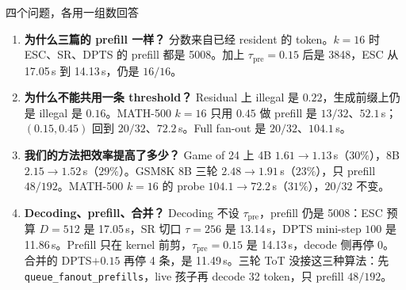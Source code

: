 \documentclass[aspectratio=169,10pt]{ctexbeamer}
\begin{document}
\begin{frame}{四个问题，各用一组数回答}
  \begin{enumerate}
    \item \textbf{为什么三篇的 prefill 一样？} 分数来自已经 resident 的 token。$k{=}16$ 时 ESC、SR、DPTS 的 prefill 都是 5008。加上 $\tau_{\mathrm{pre}}{=}0.15$ 后是 3848，ESC 从 17.05\,s 到 14.13\,s，仍是 $16/16$。
    \vspace{0.18em}
    \item \textbf{为什么不能共用一条 threshold？} Residual 上 illegal 是 $0.22$，生成前缀上仍是 illegal 是 $0.16$。MATH-500 $k{=}16$ 只用 $0.45$ 做 prefill 是 $13/32$、$52.1$\,s；$(0.15,0.45)$ 回到 $20/32$、$72.2$\,s。Full fan-out 是 $20/32$、$104.1$\,s。
    \vspace{0.18em}
    \item \textbf{我们的方法把效率提高了多少？} Game of 24 上 4B $1.61\to 1.13$\,s（$30\%$），8B $2.15\to 1.52$\,s（$29\%$）。GSM8K 8B 三轮 $2.48\to 1.91$\,s（$23\%$），只 prefill $48/192$。MATH-500 $k{=}16$ 的 probe $104.1\to 72.2$\,s（$31\%$），$20/32$ 不变。
    \vspace{0.18em}
    \item \textbf{Decoding、prefill、合并？} Decoding 不设 $\tau_{\mathrm{pre}}$，prefill 仍是 5008：ESC 预算 $D{=}512$ 是 17.05\,s，SR 切口 $\tau{=}256$ 是 13.14\,s，DPTS mini-step $100$ 是 11.86\,s。Prefill 只在 kernel 前剪，$\tau_{\mathrm{pre}}{=}0.15$ 是 14.13\,s，decode 侧再停 0。合并的 DPTS$+0.15$ 再停 4 条，是 11.49\,s。三轮 ToT 没接这三种算法：先 \texttt{queue\_fanout\_prefills}，live 孩子再 decode 32 token，只 prefill $48/192$。
  \end{enumerate}
\end{frame}
\fi
\end{document}
